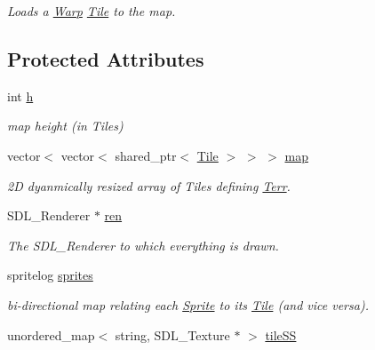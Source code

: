 \begin{DoxyCompactItemize}
\begin{DoxyCompactList}\small\item\em Loads a \hyperlink{class_warp}{Warp} \hyperlink{class_tile}{Tile} to the map. \end{DoxyCompactList}\end{DoxyCompactItemize}
\subsection*{Protected Attributes}
\begin{DoxyCompactItemize}
\item 
int \hyperlink{class_terr_aa2f06b09cb8abd0fda4abb2b696f6885}{h}\hypertarget{class_terr_aa2f06b09cb8abd0fda4abb2b696f6885}{}\label{class_terr_aa2f06b09cb8abd0fda4abb2b696f6885}

\begin{DoxyCompactList}\small\item\em map height (in Tiles) \end{DoxyCompactList}\item 
vector$<$ vector$<$ shared\+\_\+ptr$<$ \hyperlink{class_tile}{Tile} $>$ $>$ $>$ \hyperlink{class_terr_a09bb829623ee8c32ab5ea1a41ccc9d1f}{map}\hypertarget{class_terr_a09bb829623ee8c32ab5ea1a41ccc9d1f}{}\label{class_terr_a09bb829623ee8c32ab5ea1a41ccc9d1f}

\begin{DoxyCompactList}\small\item\em 2D dyanmically resized array of Tiles defining \hyperlink{class_terr}{Terr}. \end{DoxyCompactList}\item 
S\+D\+L\+\_\+\+Renderer $\ast$ \hyperlink{class_terr_afb5f048d36c4633dffba85e9a959fc68}{ren}\hypertarget{class_terr_afb5f048d36c4633dffba85e9a959fc68}{}\label{class_terr_afb5f048d36c4633dffba85e9a959fc68}

\begin{DoxyCompactList}\small\item\em The S\+D\+L\+\_\+\+Renderer to which everything is drawn. \end{DoxyCompactList}\item 
spritelog \hyperlink{class_terr_a633f21d6e20c549f8006104ae4363bea}{sprites}\hypertarget{class_terr_a633f21d6e20c549f8006104ae4363bea}{}\label{class_terr_a633f21d6e20c549f8006104ae4363bea}

\begin{DoxyCompactList}\small\item\em bi-\/directional map relating each \hyperlink{class_sprite}{Sprite} to its \hyperlink{class_tile}{Tile} (and vice versa). \end{DoxyCompactList}\item 
unordered\+\_\+map$<$ string, S\+D\+L\+\_\+\+Texture $\ast$ $>$ \hyperlink{class_terr_afdb5b0cf8c28af1c3137199038f1fd41}{tile\+SS}\hypertarget{class_terr_afdb5b0cf8c28af1c3137199038f1fd41}{}\label{class_terr_afdb5b0cf8c28af1c3137199038f1fd41}


\end{DoxyCompactItemize}
